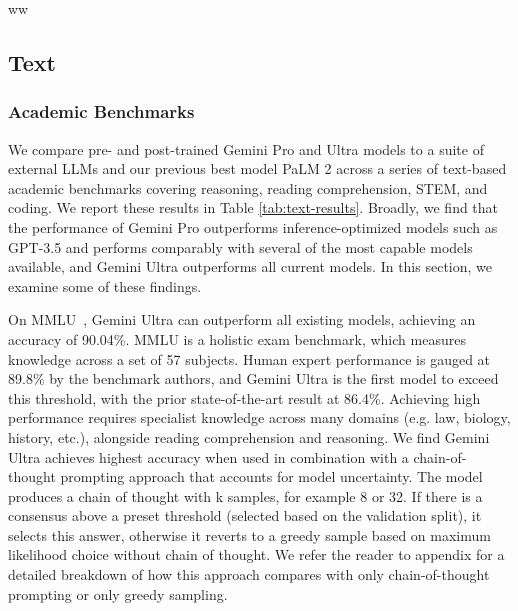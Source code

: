 ww\subsection{Text}


\subsubsection{Academic Benchmarks}
\label{sec:benchmarks}
We compare pre- and post-trained Gemini Pro and Ultra models to a suite of external LLMs and our previous best model PaLM 2 across a series of text-based academic benchmarks covering reasoning, reading comprehension, STEM, and coding. We report these results in Table \ref{tab:text-results}. Broadly, we find that the performance of Gemini Pro outperforms inference-optimized models such as GPT-3.5 and performs comparably with several of the most capable models available, and Gemini Ultra outperforms all current models. In this section, we examine some of these findings.

On MMLU~\cite{mmlu}, Gemini Ultra can outperform all existing models, achieving an accuracy of 90.04\%. MMLU is a holistic exam benchmark, which measures knowledge across a set of 57 subjects. Human expert performance is gauged at 89.8\% by the benchmark authors, and Gemini Ultra is the first model to exceed this threshold, with the prior state-of-the-art result at 86.4\%. Achieving high performance requires specialist knowledge across many domains (e.g. law, biology, history, etc.), alongside reading comprehension and reasoning. We find Gemini Ultra achieves highest accuracy when used in combination with a chain-of-thought prompting approach \cite{wei2022chain} that accounts for model uncertainty. The model produces a chain of thought with k samples, for example 8 or 32. If there is a consensus above a preset threshold (selected based on the validation split), it selects this answer, otherwise it reverts to a greedy sample based on maximum likelihood choice without chain of thought. We refer the reader to appendix for a detailed breakdown of how this approach compares with only chain-of-thought prompting or only greedy sampling. 

